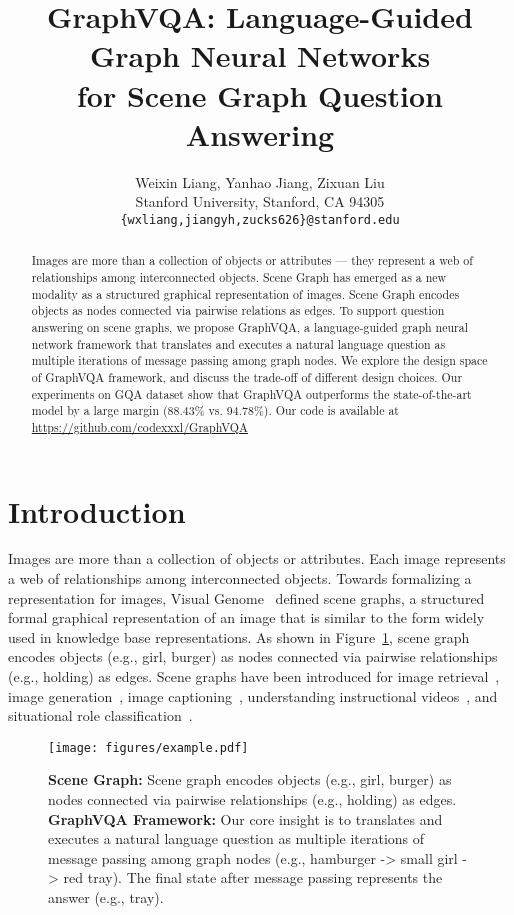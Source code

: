\documentclass[11pt]{article}
\title{
GraphVQA: Language-Guided Graph Neural Networks \\
for Scene Graph Question Answering
}
\author{Weixin Liang, Yanhao Jiang, Zixuan Liu \\
  Stanford University, Stanford, CA 94305 \\
  \texttt{\{wxliang,jiangyh,zucks626\}@stanford.edu} \\
  }
\begin{document}
\maketitle


\begin{abstract}
    Images are more than a collection of objects or attributes --- they represent a web of relationships among interconnected objects. Scene Graph has emerged as a new modality as a structured graphical representation of images. Scene Graph encodes objects as nodes connected via pairwise relations as edges. To support question answering on scene graphs, we propose GraphVQA, a language-guided graph neural network framework that translates and executes a natural language question as multiple iterations of message passing among graph nodes. We explore the design space of GraphVQA framework, and discuss the trade-off of different design choices. Our experiments on GQA dataset show that GraphVQA outperforms the state-of-the-art model by a large margin (88.43\% vs. 94.78\%). Our code is available at \url{https://github.com/codexxxl/GraphVQA} \end{abstract}




\section{Introduction}


Images are more than a collection of objects or attributes. Each image represents a web of relationships among interconnected objects. 
Towards formalizing a representation for images, Visual Genome~\cite{krishnavisualgenome} defined scene graphs, a structured formal graphical representation of an image that is similar to the form widely used in knowledge base representations. 
As shown in Figure~\ref{fig:firstFigure}, scene graph encodes objects (e.g., girl, burger) as nodes connected via pairwise relationships (e.g., holding) as edges. Scene graphs have been introduced for image retrieval~\cite{ImageRetrieval}, image generation~\cite{ImageGeneration}, image captioning~\cite{ImageCaption}, understanding instructional videos~\cite{InstructionVideo}, and situational role classification~\cite{SituationRecognition}. 


\begin{figure}
    \centering
    \texttt{[image: figures/example.pdf]}
    \vspace{-12mm}
    \caption{
    \textbf{Scene Graph:} 
    Scene graph encodes objects (e.g., girl, burger) as nodes connected via pairwise relationships (e.g., holding) as edges. 
    \textbf{GraphVQA Framework: } 
    Our core insight is to translates and executes a natural language question as multiple iterations of message passing among graph nodes (e.g., hamburger -> small girl -> red tray). 
    The final state after message passing represents the answer (e.g., tray). 
    }
    \vspace{-6mm}
    \label{fig:firstFigure}
\end{figure}
\end{document}

